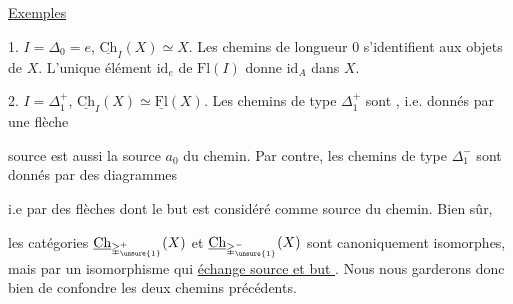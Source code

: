 



\uline{Exemples}

1. $I=\Delta_0=e$, $\underline{\mathrm{Ch}}_I(X)\simeq X$. Les chemins de longueur $0$ s'identifient aux objets  de $X$. L'unique élément $\mathrm{id}_e$ de $\mathrm{Fl}(I)$  donne $\mathrm{id}_A$ dans $X$.

2. $I=\mathbb{\Delta}_1^+$, $\underline{\mathrm{Ch}}_I(X)\simeq\underline{\mathrm{Fl}}(X)$. Les chemins de  type $\mathbb{\Delta}_1^+$ sont , i.e. donnés par une flèche


  source est aussi la source $a_0$ du chemin. Par contre,  les chemins de type $\mathbb{\Delta}_1^-$ sont donnés par des diagrammes


i.e par des flèches dont le but est considéré comme source du chemin. Bien sûr,


 les catégories $\underline{\mathrm{Ch}}_{\mathbb{\Delta}_{\unsure{1}}^{+}}(X)$ et $\underline{\mathrm{Ch}}_{\mathbb{\Delta}_{\unsure{1}}^{-}}(X)$ sont canoniquement isomorphes, mais par un isomorphisme qui \uline{échange source et but  }. Nous nous garderons donc bien de confondre les deux chemins précédents.

